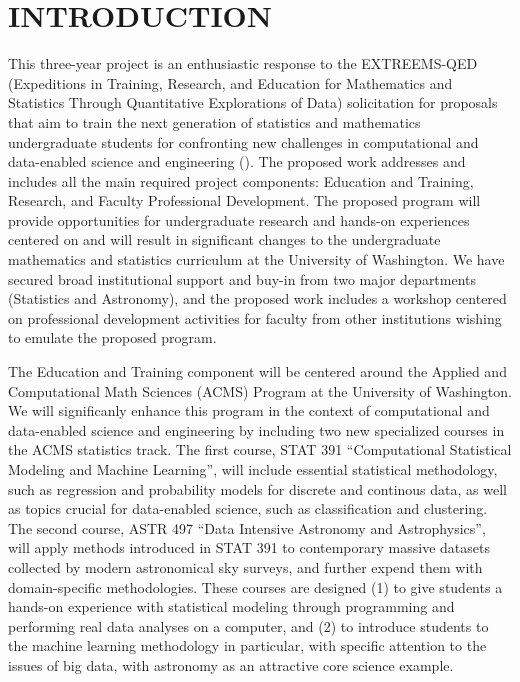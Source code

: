 \section{{\bf  INTRODUCTION}}

This three-year project is an enthusiastic response to the EXTREEMS-QED (Expeditions in Training, Research, 
and Education for Mathematics and Statistics Through Quantitative Explorations of Data) solicitation for proposals
that aim to train the next generation of statistics and mathematics undergraduate students for confronting new
challenges in computational and data-enabled science and engineering (\cdse).  The proposed work addresses and 
includes all the main required project components: Education and Training, Research, and Faculty Professional 
Development. The proposed program will provide opportunities for undergraduate research and hands-on experiences 
centered on \cdse and will result in significant changes to the undergraduate mathematics and statistics curriculum 
at the University of Washington. We have secured broad institutional support and buy-in from two major departments 
(Statistics and Astronomy), and the proposed work includes a workshop centered on professional development activities
for faculty from other institutions wishing to emulate the proposed program. 

The Education and Training component will be centered around the Applied and Computational Math Sciences (ACMS) 
Program at the University of Washington. We will significanly enhance this program in the context of computational 
and data-enabled science and engineering by including two new specialized courses in the ACMS statistics track. 
The first course, STAT 391 ``Computational Statistical Modeling and Machine Learning'', will include essential statistical 
methodology, such as regression and probability models for discrete and continous data, as well as topics crucial for 
data-enabled science, such as classification and clustering. The second course, ASTR 497 ``Data Intensive Astronomy 
and Astrophysics'', will apply methods introduced in STAT 391 to contemporary massive datasets collected by modern 
astronomical sky surveys, and further expend them with domain-specific methodologies. These courses are designed 
(1) to give students a hands-on experience with statistical modeling through programming and performing real data 
analyses on a computer, and (2) to introduce students to the machine learning methodology in particular, with specific 
attention to the issues of big data, with astronomy as an attractive core science example. 


